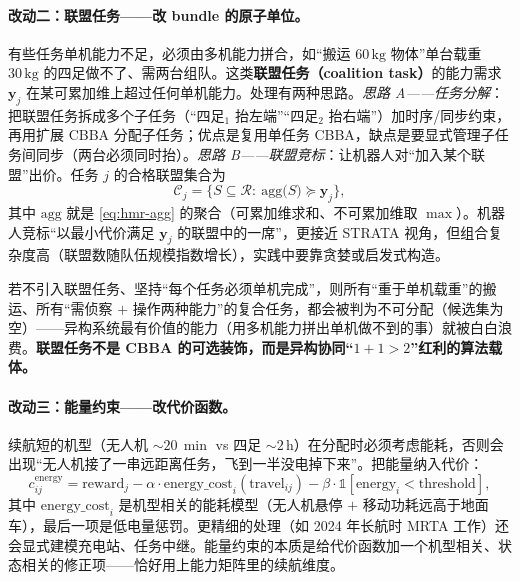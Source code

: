 \paragraph{改动二：联盟任务——改 bundle 的原子单位。}
有些任务单机能力不足，必须由多机能力拼合，如“搬运 $60\,\mathrm{kg}$ 物体”单台载重 $30\,\mathrm{kg}$ 的四足做不了、需两台组队。这类\textbf{联盟任务（coalition task）}的能力需求 $\mathbf{y}_j$ 在某可累加维上超过任何单机能力。处理有两种思路。\emph{思路 A——任务分解}：把联盟任务拆成多个子任务（“四足$_1$ 抬左端”“四足$_2$ 抬右端”）加时序/同步约束，再用扩展 CBBA 分配子任务；优点是复用单任务 CBBA，缺点是要显式管理子任务间同步（两台必须同时抬）。\emph{思路 B——联盟竞标}：让机器人对“加入某个联盟”出价。任务 $j$ 的合格联盟集合为
\begin{equation}
  \mathcal{C}_j = \Big\{S\subseteq\mathcal{R}:\ \mathrm{agg}\big(S\big)\succeq\mathbf{y}_j\Big\},
  \label{eq:hmr-coalition-set}
\end{equation}
其中 $\mathrm{agg}$ 就是 \cref{eq:hmr-agg} 的聚合（可累加维求和、不可累加维取 $\max$）。机器人竞标“以最小代价满足 $\mathbf{y}_j$ 的联盟中的一席”，更接近 STRATA 视角，但组合复杂度高（联盟数随队伍规模指数增长），实践中要靠贪婪或启发式构造。

\begin{insight}
若不引入联盟任务、坚持“每个任务必须单机完成”，则所有“重于单机载重”的搬运、所有“需侦察 $+$ 操作两种能力”的复合任务，都会被判为不可分配（候选集为空）——异构系统最有价值的能力（用多机能力拼出单机做不到的事）就被白白浪费。\textbf{联盟任务不是 CBBA 的可选装饰，而是异构协同“$1+1>2$”红利的算法载体。}
\end{insight}

\paragraph{改动三：能量约束——改代价函数。}
续航短的机型（无人机 $\sim 20\,\min$ vs 四足 $\sim 2\,\mathrm{h}$）在分配时必须考虑能耗，否则会出现“无人机接了一串远距离任务，飞到一半没电掉下来”。把能量纳入代价：
\begin{equation}
  c_{ij}^{\mathrm{energy}} = \mathrm{reward}_j - \alpha\cdot\mathrm{energy\_cost}_i(\mathrm{travel}_{ij}) - \beta\cdot\mathbb{1}[\mathrm{energy}_i < \mathrm{threshold}],
  \label{eq:hmr-energy}
\end{equation}
其中 $\mathrm{energy\_cost}_i$ 是机型相关的能耗模型（无人机悬停 $+$ 移动功耗远高于地面车），最后一项是低电量惩罚。更精细的处理（如 2024 年长航时 MRTA 工作\cite{hmrta2024longendurance}）还会显式建模充电站、任务中继。能量约束的本质是给代价函数加一个机型相关、状态相关的修正项——恰好用上能力矩阵里的续航维度。

